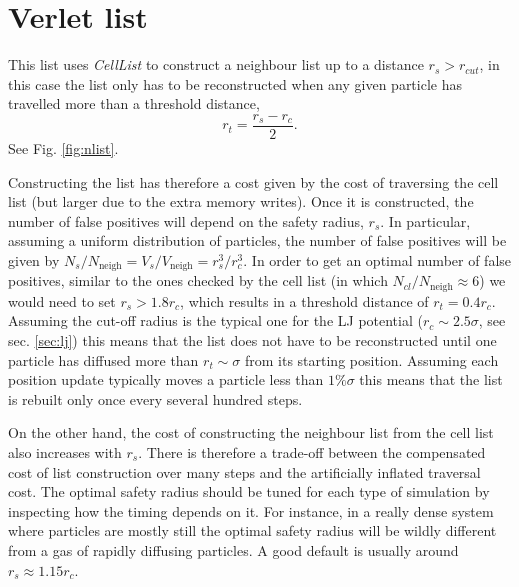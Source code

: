 \documentclass[twoside,openright,titlepage,numbers=noenddot,%
headinclude,footinclude,cleardoublepage=empty,abstract=on,
BCOR=5mm,fontsize=11pt, dvipsnames, paper=b5
]{scrreprt}
\begin{document}
\section{Verlet list}\label{sec:verletlist}

This list uses \emph{CellList} to construct a neighbour list up to a distance $r_{s} > r_{cut}$, in this case the list only has to be reconstructed when any given particle has travelled more than a threshold distance,
\begin{equation}
r_t = \frac{r_{s}-r_{c}}{2}.
\end{equation}
See Fig. \ref{fig:nlist}.

Constructing the list has therefore a cost given by the cost of traversing the cell list (but larger due to the extra memory writes). Once it is constructed, the number of false positives will depend on the safety radius, $r_s$. In particular, assuming a uniform distribution of particles, the number of false positives will be given by $N_s/N_{\text{neigh}} = V_s/V_{\text{neigh}} = r_s^3/r_c^3$. In order to get an optimal number of false positives, similar to the ones checked by the cell list (in which $N_{cl}/N_{\text{neigh}} \approx 6$) we would need to set $r_s > 1.8r_c$, which results in a threshold distance of $r_t = 0.4r_c$. Assuming the cut-off radius is the typical one for the \gls{LJ} potential ($r_c \sim 2.5\sigma$, see sec. \ref{sec:lj}) this means that the list does not have to be reconstructed until one particle has diffused more than $r_t \sim \sigma$ from its starting position. Assuming each position update typically moves a particle less than $1\%\sigma$ this means that the list is rebuilt only once every several hundred steps.

On the other hand, the cost of constructing the neighbour list from the cell list also increases with $r_s$. There is therefore a trade-off between the compensated cost of list construction over many steps and the artificially inflated traversal cost. The optimal safety radius should be tuned for each type of simulation by inspecting how the timing depends on it. For instance, in a really dense system where particles are mostly still the optimal safety radius will be wildly different from a gas of rapidly diffusing particles. A good default is usually around $r_s\approx 1.15r_c$. 
\end{document}
